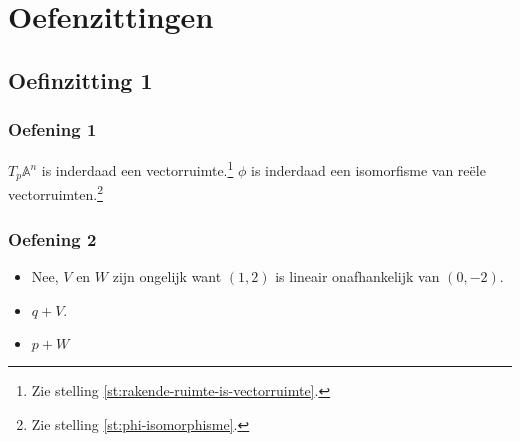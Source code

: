 \documentclass[main.tex]{subfiles}
\begin{document}
\chapter{Oefenzittingen}
\label{cha:oefenzittingen}

\section{Oefinzitting 1}
\label{sec:oz1}

\subsection*{Oefening 1}
$T_{p}\mathbb{A}^{n}$ is inderdaad een vectorruimte.\footnote{Zie stelling \ref{st:rakende-ruimte-is-vectorruimte}.}
$\phi$ is inderdaad een isomorfisme van re\"ele vectorruimten.\footnote{Zie stelling \ref{st:phi-isomorphisme}.}

\subsection*{Oefening 2}

\begin{itemize}
\item Nee, $V$ en $W$ zijn ongelijk want $(1,2)$ is lineair onafhankelijk van $(0,-2)$.
\item $q + V$.
\item $p + W$
\end{itemize}
\end{document}
